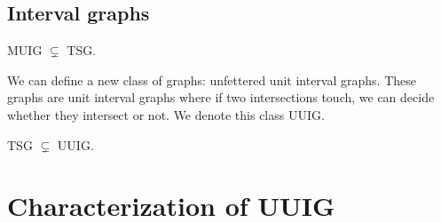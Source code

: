 \subsection{Interval graphs}

\begin{theorem}
  MUIG $\subsetneq$ TSG.
\end{theorem}

We can define a new class of graphs: unfettered unit interval graphs. These graphs
are unit interval graphs where if two intersections touch, we can decide whether
they intersect or not. We denote this class UUIG.

\begin{theorem}
  TSG $\subsetneq$ UUIG.
\end{theorem}


\section{Characterization of UUIG}

\todo{}
